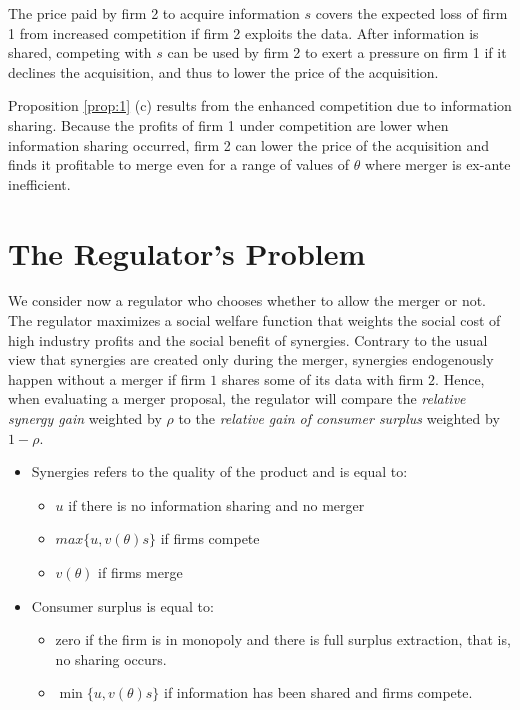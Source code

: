 \documentclass[a4paper,leqno]{article}%
\renewcommand{\t}{\theta}
\begin{document}
\medskip

The price paid by firm 2 to acquire information $s$ covers the expected loss of firm 1 from increased competition if firm 2 exploits the data. After information is shared, competing with $s$ can be used by firm 2 to exert a pressure on firm 1 if it declines the acquisition, and thus to lower the price of the acquisition. 

\medskip

Proposition \ref{prop:1} (c) results from the enhanced competition due to information sharing. Because the profits of firm 1 under competition are lower when information sharing occurred, firm 2 can lower the price of the acquisition and finds it profitable to merge even for a range of values of $\t$ where merger is ex-ante inefficient.

\medskip

\section{The Regulator's Problem}

We consider now a regulator who chooses whether to allow the merger or not. The regulator maximizes a social welfare function that weights the social cost of high industry profits and the social benefit of synergies. Contrary to the usual view that synergies are created only during the merger, synergies endogenously happen without a merger if firm $1$ shares some of its data with firm $2$. Hence, when evaluating a merger proposal, the regulator will compare the \emph{relative synergy gain} weighted by $\rho$ to the \emph{relative gain of consumer surplus} weighted by $1-\rho$.


\begin{itemize}
    \item Synergies refers to the quality of the product and is equal to:
    \begin{itemize}
        \item $u$ if there is no information sharing and no merger
        \item $max\{u,v(\t)s\}$ if firms compete
        \item $v(\t)$ if firms merge
    \end{itemize}
    \item Consumer surplus is equal to:
    \begin{itemize}
        \item zero if the firm is in monopoly and there is full surplus extraction, that is, no sharing occurs.
        \item $\min\{u,v(\t)s\}$ if information has been shared and firms compete.
    \end{itemize}
\end{itemize}
\end{document}
